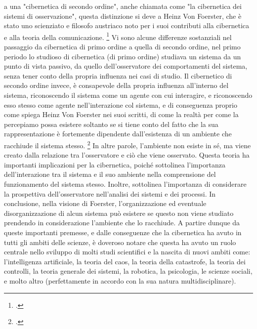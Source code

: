 a una "cibernetica di secondo ordine", anche chiamata come "la cibernetica dei sistemi di osservazione",
questa distinzione si deve a Heinz Von Foerster, 
che è stato uno scienziato e filosofo austriaco noto per i suoi contributi 
alla cibernetica e alla teoria della comunicazione. \footcite{scottsecondordercyb}
Vi sono alcune differenze sostanziali nel passaggio da cibernetica di primo ordine a quella di secondo ordine, 
nel primo periodo lo studioso di cibernetica (di primo ordine)
studiava un sistema da un punto di vista passivo, da quello dell'osservatore
dei comportamenti del sistema, senza tener conto della propria influenza 
nei casi di studio.
Il cibernetico di secondo ordine invece, è consapevole della propria 
influenza all'interno del sistema, riconoscendo il sistema come un agente con cui interagire, 
e riconoscendo esso stesso come agente nell'interazione col sistema, 
e di conseguenza proprio come spiega Heinz Von Foerster nei suoi scritti,
di come la realtà per come la percepiamo possa esistere
soltanto se si tiene conto del fatto che la sua rappresentazione è fortemente dipendente 
dall'esistenza di un ambiente che racchiude il sistema stesso. \footcite{understandingunderstanding}
In altre parole, l'ambiente non esiste in sé, ma viene creato dalla relazione 
tra l'osservatore e ciò che viene osservato.
Questa teoria ha importanti implicazioni per la cibernetica, 
poiché sottolinea l'importanza dell'interazione tra il sistema e il suo ambiente 
nella comprensione del funzionamento del sistema stesso. 
Inoltre, sottolinea l'importanza di considerare la prospettiva 
dell'osservatore nell'analisi dei sistemi e dei processi.
In conclusione, nella visione di Foerster, 
l'organizzazione ed eventuale disorganizzazione di alcun sistema può esistere 
se questo non viene studiato prendendo in considerazione l'ambiente che lo racchiude.
A partire dunque da queste importanti premesse, e dalle conseguenze 
che la cibernetica ha avuto in tutti gli ambiti delle scienze, è doveroso 
notare che questa ha avuto un ruolo centrale nello sviluppo di
molti studi scientifici e la nascita
di nuovi ambiti come: l'intelligenza artificiale, la teoria del caos,
la teoria della catastrofe,
la teoria dei controlli, la teoria generale dei sistemi, la robotica,
la psicologia, le scienze sociali, e molto altro 
(perfettamente in accordo con la sua natura multidisciplinare).

